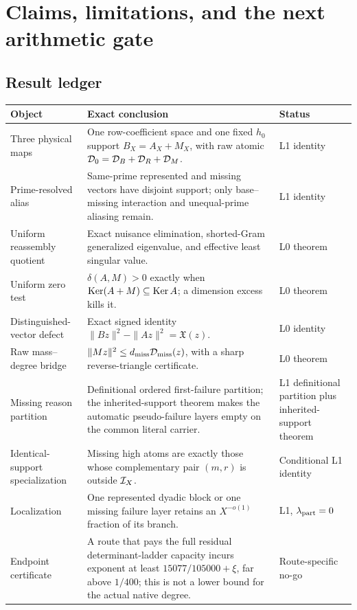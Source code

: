 \section{Claims, limitations, and the next arithmetic gate}
\label{sec:tpc60-claims-next}

\subsection{Result ledger}

\begin{center}
\small
\begin{tabular}{>{\raggedright\arraybackslash}p{}
                >{\raggedright\arraybackslash}p{}
                >{\raggedright\arraybackslash}p{}}
\toprule
Object & Exact conclusion & Status\\
\midrule
Three physical maps
& One row-coefficient space and one fixed \(h_0\) support
  \(B_X=A_X+M_X\), with raw atomic
  \(\mathcal D_0=\mathcal D_B+\mathcal D_R+\mathcal D_M\).
& L1 identity\\
\addlinespace
Prime-resolved alias
& Same-prime represented and missing vectors have disjoint support;
  only base--missing interaction and unequal-prime aliasing remain.
& L1 identity\\
\addlinespace
Uniform reassembly quotient
& Exact nuisance elimination, shorted-Gram generalized eigenvalue,
  and effective least singular value.
& L0 theorem\\
\addlinespace
Uniform zero test
& \(\delta(A,M)>0\) exactly when
  \(\operatorname{Ker}(A+M)\subseteq\operatorname{Ker} A\); a dimension excess kills it.
& L0 theorem\\
\addlinespace
Distinguished-vector defect
& Exact signed identity
  \(\|Bz\|^2-\|Az\|^2=\mathfrak X(z)\).
& L0 identity\\
\addlinespace
Raw mass--degree bridge
& \(\|Mz\|^2\le d_{\rm miss}\mathcal D_{\rm miss}(z)\), with a sharp
  reverse-triangle certificate.
& L0 theorem\\
\addlinespace
Missing reason partition
& Definitional ordered first-failure partition; the inherited-support
  theorem makes the automatic pseudo-failure layers empty on the common
  literal carrier.
& L1 definitional partition plus inherited-support theorem\\
\addlinespace
Identical-support specialization
& Missing high atoms are exactly those whose complementary pair
  \((m,r)\) is outside \(\mathcal I_X\).
& Conditional L1 identity\\
\addlinespace
Localization
& One represented dyadic block or one missing failure layer retains an
  \(X^{-o(1)}\) fraction of its branch.
& L1, \(\lambda_{\rm part}=0\)\\
\addlinespace
Endpoint certificate
& A route that pays the full residual determinant-ladder capacity incurs
  exponent at least \(15077/105000+\xi\), far above \(1/400\); this is not
  a lower bound for the actual native degree.
& Route-specific no-go\\
\bottomrule
\end{tabular}
\end{center}

